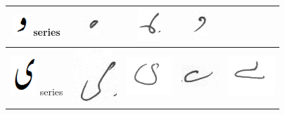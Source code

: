\documentclass[a4paper,conference]{IEEEtran}
\begin{document}
\begin{table}[h]
\begin{tabular}{@{}ccccc@{}}
\hline
\includegraphics[scale=0.15]{wao_orig} series & \includegraphics[scale=0.15]{74} & \includegraphics[scale=0.15]{75}  & 
\includegraphics[scale=0.15]{76}  & \\
\hline
\includegraphics[scale=0.10]{choti_ye_orig} series & \includegraphics[scale=0.08]{77} & \includegraphics[scale=0.15]{78} & 
\includegraphics[scale=0.15]{79} &
\includegraphics[scale=0.10]{80} \\
\hline
\end{tabular}
\end{table}
\end{document}
